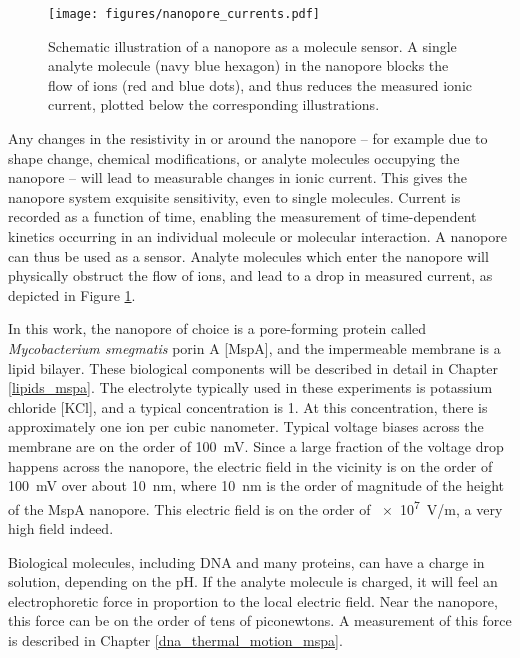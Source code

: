 \begin{figure}[h]
\begin{centering}
\texttt{[image: figures/nanopore\_currents.pdf]}
\caption[The nanopore as a molecule sensor]{Schematic illustration of a nanopore as a molecule sensor.  A single analyte molecule (navy blue hexagon) in the nanopore blocks the flow of ions (red and blue dots), and thus reduces the measured ionic current, plotted below the corresponding illustrations.}
\label{fig:nanopore_current_blockage}
\end{centering}
\end{figure}

Any changes in the resistivity in or around the nanopore -- for example due to shape change, chemical modifications, or analyte molecules occupying the nanopore -- will lead to measurable changes in ionic current.  This gives the nanopore system exquisite sensitivity, even to single molecules.  Current is recorded as a function of time, enabling the measurement of time-dependent kinetics occurring in an individual molecule or molecular interaction.  A nanopore can thus be used as a sensor.  Analyte molecules which enter the nanopore will physically obstruct the flow of ions, and lead to a drop in measured current, as depicted in Figure \ref{fig:nanopore_current_blockage}.

In this work, the nanopore of choice is a pore-forming protein called \textit{Mycobacterium smegmatis} porin A [MspA], and the impermeable membrane is a lipid bilayer.  These biological components will be described in detail in Chapter \ref{lipids_mspa}.  The electrolyte typically used in these experiments is potassium chloride [KCl], and a typical concentration is \SI{1}{\Molar}.  At this concentration, there is approximately one ion per cubic nanometer.  Typical voltage biases across the membrane are on the order of \SI{100}{\mV}.  Since a large fraction of the voltage drop happens across the nanopore, the electric field in the vicinity is on the order of \SI{100}{\mV} over about \SI{10}{\nm}, where \SI{10}{\nm} is the order of magnitude of the height of the MspA nanopore.  This electric field is on the order of \SI{e7}{\V/\m}, a very high field indeed.

Biological molecules, including DNA and many proteins, can have a charge in solution, depending on the pH.  If the analyte molecule is charged, it will feel an electrophoretic force in proportion to the local electric field.  Near the nanopore, this force can be on the order of tens of piconewtons.  A measurement of this force is described in Chapter \ref{dna_thermal_motion_mspa}.

